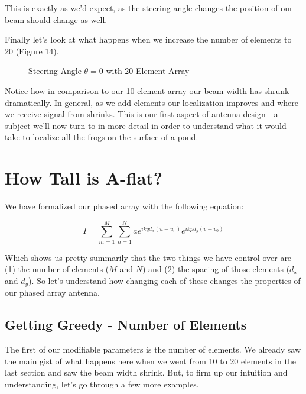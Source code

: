 \documentclass[10pt,a4paper]{article}
\begin{document}
This is exactly as we'd expect, as the steering angle changes the position of our beam should change as well. 

Finally let's look at what happens when we increase the number of elements to 20 (Figure 14).

\begin{figure}[!htb]
\caption{\label{fig:my-label} Steering Angle $\theta=0$ with 20 Element Array}
\end{figure}

Notice how in comparison to our 10 element array our beam width has shrunk dramatically. In general, as we add elements our localization improves and where we receive signal from shrinks. This is our first aspect of antenna design - a subject we'll now turn to in more detail in order to understand what it would take to localize all the frogs on the surface of a pond. 

\clearpage


\section{How Tall is A-flat?}
We have formalized our phased array with the following equation:

\begin{equation}
I=\sum_{m=1}^M \sum_{n=1}^N  ae^{ikqd_x(u-u_0)}e^{ikpd_y(v-v_0)}
\end{equation}

Which shows us pretty summarily that the two things we have control over are (1) the number of elements ($M$ and $N$) and (2) the spacing of those elements ($d_x$ and $d_y$). So let's understand how changing each of these changes the properties of our phased array antenna. 

\subsection{Getting Greedy - Number of Elements}
The first of our modifiable parameters is the number of elements. We already saw the main gist of what happens here when we went from 10 to 20 elements in the last section and saw the beam width shrink. But, to firm up our intuition and understanding, let's go through a few more examples. 
\end{document}
